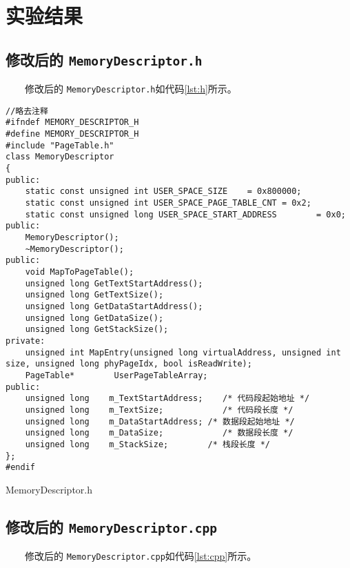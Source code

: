 \section{实验结果}
\subsection{修改后的 \texttt{MemoryDescriptor.h}}
　　修改后的 \texttt{MemoryDescriptor.h}如代码\ref{lst:h}所示。

\begin{listing}[htbp]
    \begin{verbatim}
//略去注释
#ifndef MEMORY_DESCRIPTOR_H
#define MEMORY_DESCRIPTOR_H
#include "PageTable.h"
class MemoryDescriptor
{
public:
    static const unsigned int USER_SPACE_SIZE    = 0x800000; 
    static const unsigned int USER_SPACE_PAGE_TABLE_CNT = 0x2;
    static const unsigned long USER_SPACE_START_ADDRESS        = 0x0;
public:
    MemoryDescriptor();
    ~MemoryDescriptor();
public:
    void MapToPageTable();
    unsigned long GetTextStartAddress();
    unsigned long GetTextSize();
    unsigned long GetDataStartAddress();
    unsigned long GetDataSize();
    unsigned long GetStackSize();
private:
    unsigned int MapEntry(unsigned long virtualAddress, unsigned int size, unsigned long phyPageIdx, bool isReadWrite);
    PageTable*        UserPageTableArray;
public:
    unsigned long    m_TextStartAddress;    /* 代码段起始地址 */
    unsigned long    m_TextSize;            /* 代码段长度 */
    unsigned long    m_DataStartAddress; /* 数据段起始地址 */
    unsigned long    m_DataSize;            /* 数据段长度 */
    unsigned long    m_StackSize;        /* 栈段长度 */
};
#endif
    \end{verbatim}
    \caption{MemoryDescriptor.h}\label{lst:h}
\end{listing}
\subsection{修改后的 \texttt{MemoryDescriptor.cpp}}
　　修改后的 \texttt{MemoryDescriptor.cpp}如代码\ref{lst:cpp}所示。

